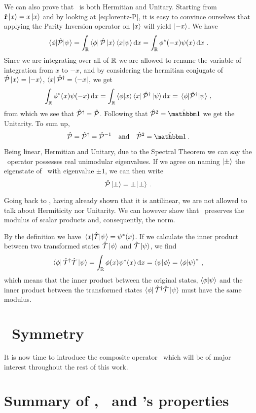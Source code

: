         We can also prove that \hP\ is both Hermitian and Unitary. Starting from $\hat{\vb{r}}\ket{x} = x\ket{x}$ and by looking at \eqref{eq:lorentz-P}, it is easy to convince ourselves that applying the Parity Inversion operator on $\ket{x}$ will yield $\ket{-x}$. We have
        \begin{equation*}
            \mel{\phi}{\hP}{\psi}
            = \int_{\bbR}\bra{\phi}\hP\ket{x}\bra{x}\ket{\psi}\dd{x}
            = \int_{\bbR}\phi^*\pqty{-x}\psi\pqty{x}\dd{x}
            \myperiod
        \end{equation*}
        Since we are integrating over all of $\mathbb{R}$ we are allowed to rename the variable of integration from $x$ to $-x$, and by considering the hermitian conjugate of $\mathcal{\hat{P}}\ket{x} = \ket{-x}$, $\bra{x}\mathcal{\hat{P}}^\dag = \bra{-x}$, we get
        \begin{equation*}
            \int_{\bbR}\phi^*\pqty{x}\psi\pqty{-x}\dd{x}
            = \int_{\bbR}\bra{\phi}\ket{x}\bra{x}\hP^\dag\ket{\psi}\dd{x}
            = \mel{\phi}{\hP^\dag}{\psi}
            \mycomma
        \end{equation*}
        from which we see that $\mathcal{\hat{P}}^\dag = \mathcal{\hat{P}}$. Following that $\hP^2 = \hat{\idM}$ we get the Unitarity. To sum up,
        \begin{equation}
            \label{eq:P-properties}
            \hP = \hP^\dag = \hP^{-1}
            \qand
            \hP^2 = \hat{\idM}
            \myperiod
        \end{equation}

        Being linear, Hermitian and Unitary, due to the Spectral Theorem we can say the \hP\ operator possesses real unimodular eigenvalues. If we agree on naming $\ket{\pm}$ the eigenstate of \hP\ with eigenvalue $\pm 1$, we can then write
        \begin{equation}
            \mathcal{\hat{P}}\ket{\pm} = \pm\ket{\pm}\,\text{.}
        \end{equation}
        
        Going back to \hT, having already shown that it is antilinear, we are not allowed to talk about Hermiticity nor Unitarity. We can however show that \hT\ preserves the modulus of scalar products and, consequently, the norm.

        By the definition we have $\mel{x}{\hT}{\psi} = \psi^*\pqty{x}$. If we calculate the inner product between two transformed states $\mathcal{\hat{T}}\ket{\phi}$ and $\mathcal{\hat{T}}\ket{\psi}$, we find
        \begin{equation*}
            \bra{\phi}\hT^\dag\hT\ket{\psi} = \int_\bbR \phi\pqty{x}\psi^*\pqty{x}\dd{x} = \bra{\psi}\ket{\phi} = \bra{\phi}\ket{\psi}^*\mycomma
        \end{equation*}
        which means that the inner product between the original states, $\braket{\phi}{\psi}$ and the inner product between the transformed states $\bra{\phi}\mathcal{\hat{T}}^\dag\mathcal{\hat{T}}\ket{\psi}$ must have the same modulus.
    \section{\PT\ Symmetry}
        It is now time to introduce the composite operator \hPT\ which will be of major interest throughout the rest of this work.
    \section{Summary of \hP, \hT\ and \hPT's properties}